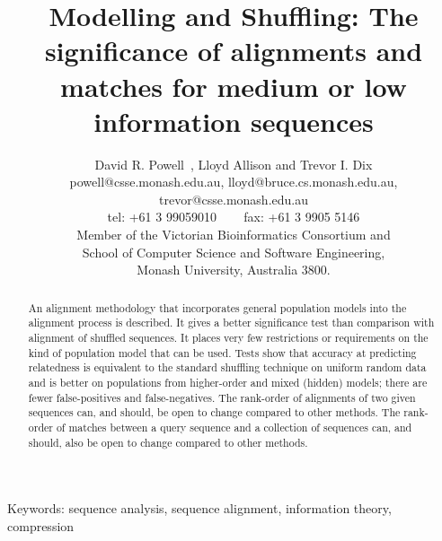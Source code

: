 \documentclass[a4paper,11pt,oneside]{article}
\begin{document}
\title{Modelling and Shuffling: The significance of alignments and matches for
medium or low information sequences}

\author{
  David R. Powell\footnotemark[1]~, Lloyd Allison and Trevor I. Dix \\
{\small powell@csse.monash.edu.au, lloyd@bruce.cs.monash.edu.au, trevor@csse.monash.edu.au} \\
{\small tel: +61 3 99059010 ~~~ fax: +61 3 9905 5146} \\
  Member of the Victorian Bioinformatics Consortium and \\
  School of Computer Science and Software Engineering, \\
  Monash University, Australia 3800.}

\renewcommand{\thefootnote}{\fnsymbol{footnote}}
\renewcommand{\thefootnote}{\arabic{footnote}}

\date{}
\maketitle



\begin{abstract}
An alignment methodology that incorporates general
population models into the alignment process is described.
It gives a better significance test than comparison with alignment of shuffled
sequences.
It places very few restrictions or requirements on the kind of
population model that can be used.
Tests show that accuracy at predicting relatedness is equivalent to
the standard shuffling technique on uniform random data and
is better on populations from higher-order and mixed (hidden) models;
there are fewer false-positives and false-negatives.
The rank-order of alignments of two given sequences can,
and should, be open to change compared to other methods.
The rank-order of matches between a query sequence and a collection of
sequences can, and should, also be open to change compared to other methods. 
\end{abstract}

{\small Keywords: sequence analysis, sequence alignment, information theory, compression}

\end{document}

